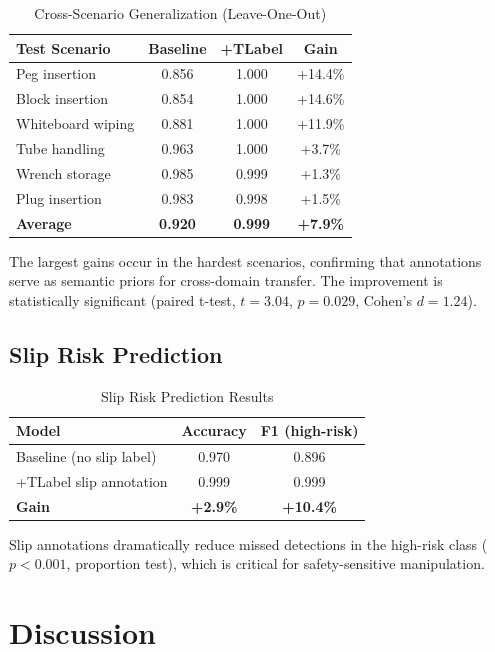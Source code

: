 \documentclass[conference]{IEEEtran}
\begin{document}
\begin{table}[t]
\centering
\caption{Cross-Scenario Generalization (Leave-One-Out)}
\label{tab:generalization}
\begin{tabular}{lccc}
\toprule
\textbf{Test Scenario} & \textbf{Baseline} & \textbf{+TLabel} & \textbf{Gain} \\
\midrule
Peg insertion & 0.856 & 1.000 & +14.4\% \\
Block insertion & 0.854 & 1.000 & +14.6\% \\
Whiteboard wiping & 0.881 & 1.000 & +11.9\% \\
Tube handling & 0.963 & 1.000 & +3.7\% \\
Wrench storage & 0.985 & 0.999 & +1.3\% \\
Plug insertion & 0.983 & 0.998 & +1.5\% \\
\midrule
\textbf{Average} & \textbf{0.920} & \textbf{0.999} & \textbf{+7.9\%} \\
\bottomrule
\end{tabular}
\end{table}

The largest gains occur in the hardest scenarios, confirming that annotations serve as semantic priors for cross-domain transfer. The improvement is statistically significant (paired t-test, $t=3.04$, $p=0.029$, Cohen's $d=1.24$).

\subsection{Slip Risk Prediction}

\begin{table}[t]
\centering
\caption{Slip Risk Prediction Results}
\label{tab:slip_pred}
\begin{tabular}{lcc}
\toprule
\textbf{Model} & \textbf{Accuracy} & \textbf{F1 (high-risk)} \\
\midrule
Baseline (no slip label) & 0.970 & 0.896 \\
+TLabel slip annotation & 0.999 & 0.999 \\
\textbf{Gain} & \textbf{+2.9\%} & \textbf{+10.4\%} \\
\bottomrule
\end{tabular}
\end{table}

Slip annotations dramatically reduce missed detections in the high-risk class ($p<0.001$, proportion test), which is critical for safety-sensitive manipulation.

\section{Discussion}
\end{document}
